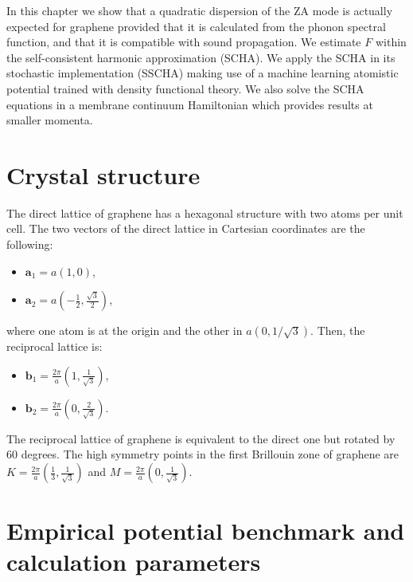 In this chapter we show that a quadratic dispersion of the ZA mode is actually expected for graphene provided that it 
is calculated from the phonon spectral function, and that it is compatible with sound propagation. We estimate $F$ 
within the self-consistent harmonic approximation (SCHA). We apply the SCHA in its 
stochastic implementation (SSCHA) making use of a machine learning atomistic potential trained with density 
functional theory\cite{rowe2018development}. We also solve the SCHA equations in a membrane continuum Hamiltonian 
which provides results at smaller momenta.

\section{Crystal structure}

The direct lattice of graphene has a hexagonal structure with two atoms per unit cell. The two vectors of the direct 
lattice in Cartesian coordinates are the following:
\begin{itemize}
 \item $\mathbf{a}_{1}=a(1,0)$,
 \item $\mathbf{a}_{2}=a\left(-\frac{1}{2},\frac{\sqrt{3}}{2}\right)$,
\end{itemize}
where one atom is at the origin and the other in $a(0,1/\sqrt{3})$. Then, the reciprocal lattice is:
\begin{itemize}
 \item $\mathbf{b}_{1}=\frac{2\pi}{a}\left(1,\frac{1}{\sqrt{3}}\right)$,
 \item $\mathbf{b}_{2}=\frac{2\pi}{a}\left(0,\frac{2}{\sqrt{3}}\right)$.
\end{itemize}
The reciprocal lattice of graphene is equivalent to the direct one but rotated by $60$ degrees. The high symmetry 
points in the first Brillouin zone of graphene are $K=\frac{2\pi}{a}\left(\frac{1}{3},\frac{1}{\sqrt{3}}\right)$ and 
$M=\frac{2\pi}{a}\left(0,\frac{1}{\sqrt{3}}\right)$. 

\section{Empirical potential benchmark and calculation parameters}

